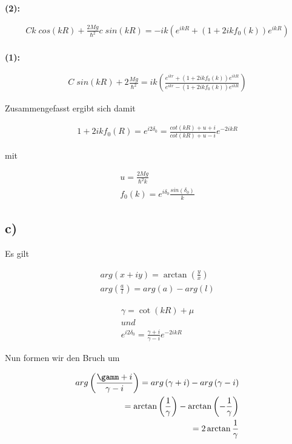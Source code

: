  \textbf{(2):}
 
 \begin{align}
 Ck \; cos \left(kR\right) + \frac{2Mg}{\hbar^2} c \; sin \left(kR\right) = -ik
 \left( e^{ikR} + \left( 1 + 2ik f_0 \left(k\right) \right) e^{ikR} \right) \\
 \end{align}
 
 \textbf{(1):}
 
 \begin{align}
 C \; sin \left(kR\right) + 2\frac{Mg}{\hbar^2} = ik \left( \frac{e^{ikr} +
 \left(1+2ikf_0\left(k\right) \right) e^{ikR} }{e^{ikr} -
 \left(1+2ikf_0\left(k\right) \right) e^{ikR}} \right)
 \end{align}
 
 Zusammengefasst ergibt sich damit
 
 \begin{align}
 1 + 2ikf_0 \left(R\right) = e^{i2\delta_0} = \frac{cot\left(kR\right) + u + i
 }{cot\left(kR\right) + u - i} e^{-2ikR}
 \end{align}
 
 mit
 
 \begin{align}
 u = \frac{2Mg}{\hbar^2k} \\
 f_0 \left(k\right) = e^{i\delta_0} \frac{sin \left(\delta_0\right)}{k}
 \end{align}
 
 \subsection{c)}
 
 Es gilt
 
 \begin{align}
 arg \left(x+iy\right) = \arctan{\left(\frac{y}{x}\right)} \\
 arg \left(\frac{a}{l} \right) = arg \left(a\right) - arg \left(l\right)
 \end{align}
 
 \begin{align}
 \gamma = \cot{\left(kR\right)} + \mu \\
 und \\
 e^{i2\delta_0} = \frac{\gamma +i}{\gamma -i} e^{-2ikR}
 \end{align}
 
 Nun formen wir den Bruch um
 
 \begin{align}
 arg \left( \frac{\gamm +i}{\gamma -i} \right) = arg \left(\gamma +i\right) -
 arg \left(\gamma -i\right) \\
 = \arctan{\left(\frac{1}{\gamma} \right)} - \arctan{\left(-\frac{1}{\gamma}
 \right)} \\
 = 2 \arctan{\frac{1}{\gamma} }
 \end{align}
 
